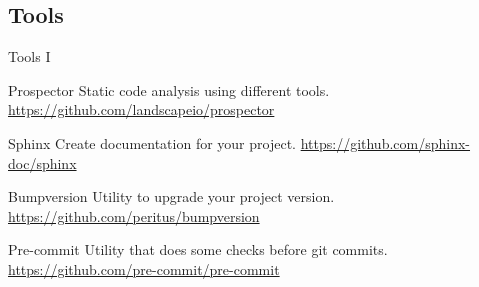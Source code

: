 \subsection{Tools}
\begin{frame}{Tools I}
    \begin{block}{Prospector}
        Static code analysis using different tools.
        \href{https://github.com/landscapeio/prospector}{https://github.com/landscapeio/prospector}
    \end{block}
    \pause
    \begin{block}{Sphinx}
        Create documentation for your project.
        \href{https://github.com/sphinx-doc/sphinx}{https://github.com/sphinx-doc/sphinx}
    \end{block}
    \pause
    \begin{block}{Bumpversion}
        Utility to upgrade your project version.
        \href{https://github.com/peritus/bumpversion}{https://github.com/peritus/bumpversion}
    \end{block}
    \pause
    \begin{block}{Pre-commit}
        Utility that does some checks before git commits.
        \href{https://github.com/pre-commit/pre-commit}{https://github.com/pre-commit/pre-commit}
    \end{block}
\end{frame}
